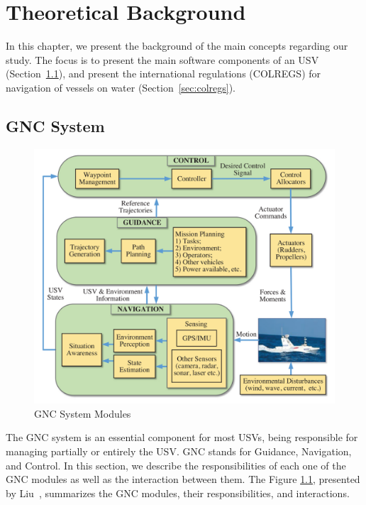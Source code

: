 \chapter{Theoretical Background \label{chap:2_TheoreticalBackground}}

    In this chapter, we present the background of the main concepts regarding our study. The focus is to present the main software components of an \acl{USV} (Section~\ref{sec:gnc_system}), and present the international regulations (\acs{COLREGS}) for navigation of vessels on water  (Section~\ref{sec:colregs}).

\section{GNC System}
\label{sec:gnc_system}    
    
    \begin{figure}[H]
        \centering
        \includegraphics[scale=0.85]{figs/Chap2/Liu2016Unmanned_GNCSystem.png}
        \caption{\ac{GNC} System Modules~\cite{Liu2016Unmanned}}
        \label{fig:Liu2016Unmanned_GNCSystem}
    \end{figure}
    
    The \acs{GNC} system is an essential component for most \acp{USV}, being responsible for managing partially or entirely the \ac{USV}. \acs{GNC} stands for Guidance, Navigation, and Control. In this section, we describe the responsibilities of each one of the \ac{GNC} modules as well as the interaction between them. The Figure \ref{fig:Liu2016Unmanned_GNCSystem}, presented by Liu~\cite{Liu2016Unmanned}, summarizes the \acs{GNC} modules, their responsibilities, and interactions.
    
